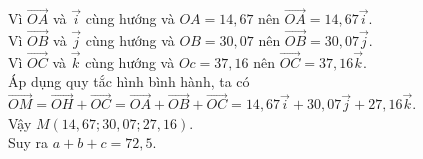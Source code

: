 \begin{ex}
{		Vì $\overrightarrow{OA}$ và $\overrightarrow i$ cùng hướng và $OA=14{,}67$ nên $\overrightarrow{OA}=14{,}67\overrightarrow i$.\\
		Vì $\overrightarrow{OB}$ và $\overrightarrow j$ cùng hướng và $OB=30{,}07$ nên $\overrightarrow{OB}=30{,}07\overrightarrow j$.\\
		Vì $\overrightarrow{OC}$ và $\overrightarrow k$ cùng hướng và $Oc=37{,}16$ nên $\overrightarrow{OC}=37{,}16\overrightarrow k$.\\
		Áp dụng quy tắc hình bình hành, ta có\\
		$\overrightarrow{OM}=\overrightarrow{OH}+\overrightarrow{OC}=\overrightarrow{OA}+\overrightarrow{OB}+\overrightarrow{OC}=14{,}67\overrightarrow i+30{,}07\overrightarrow j+27{,}16\overrightarrow k$.\\
		Vậy $M(14{,}67;30{,}07;27{,}16)$.\\
		Suy ra $a+b+c=72{,}5$.
	}
\end{ex}

